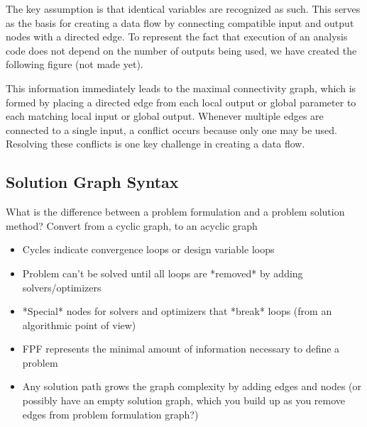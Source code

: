     The key assumption is that identical variables are recognized as such. This serves as the basis for creating a data flow by connecting compatible input and output nodes with a directed edge. 
    To represent the fact that execution of an analysis code does not depend on the number of outputs being used, we have created the following figure (not made yet).
    
    This information immediately leads to the maximal connectivity graph, which is formed by placing a directed edge from each local output or global parameter to each matching local input or global output. 
    Whenever multiple edges are connected to a single input, a conflict occurs because only one may be used. Resolving these conflicts is one key challenge in creating a data flow.

    \subsection{Solution Graph Syntax}
    What is the difference between a problem formulation and a problem solution method? Convert from a cyclic graph, to an acyclic graph
    \begin{itemize}
        \item Cycles indicate convergence loops or design variable loops
        \item Problem can't be solved until all loops are *removed* by adding solvers/optimizers
        \item *Special* nodes for solvers and optimizers that *break* loops (from an algorithmic point of view)
        \item FPF represents the minimal amount of information necessary to define a problem
        \item Any solution path grows the graph complexity by adding edges and nodes (or possibly have an empty solution graph, which you build up
        as you remove edges from problem formulation graph?)
    \end{itemize}
